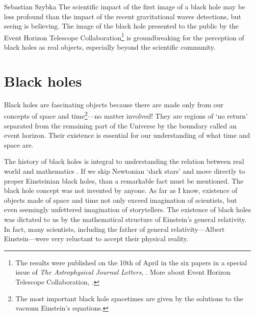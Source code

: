\begin{artengenv}{Sebastian Szybka}
The scientific impact of the first image of a black hole may be less profound than the impact of the recent gravitational waves detections, but seeing is believing. The image of the black hole presented to the public by the Event Horizon Telescope Collaboration\footnote{The results were published on the 10th of April in the six papers in a special issue of \textit{The Astrophysical Journal Letters}, \parencite[see e.g.][]{the_event_horizon_telescope_collaboration_first_2019}. More about Event Horizon Telescope Collaboration, \parencite[see][]{noauthor_event_nodate}.} is groundbreaking for the perception of black holes as real objects, especially beyond the scientific community. 

\section{Black holes}

Black holes are fascinating objects because there are made only from our concepts of space and time\footnote{The most important black hole spacetimes are given by the solutions to the vacuum Einstein's equations.}---no matter involved! They are regions of `no return' separated from the remaining part of the Universe by the boundary called an event horizon. Their existence is essential for our understanding of what time and space are. 

The history of black holes is integral to understanding the relation between real world and mathematics \parencite{malec_black_2018}. If we skip Newtonian `dark stars' and move directly to proper Einsteinian black holes, than a remarkable fact must be mentioned. The black hole concept was not invented by anyone. As far as I know, existence of objects made of space and time not only exceed imagination of scientists, but even seemingly unfettered imagination of storytellers. The existence of black holes was dictated to us by the mathematical structure of Einstein's general relativity. In fact, many scientists, including the father of general relativity---Albert Einstein---were very reluctant to accept their physical reality.


\end{artengenv}
